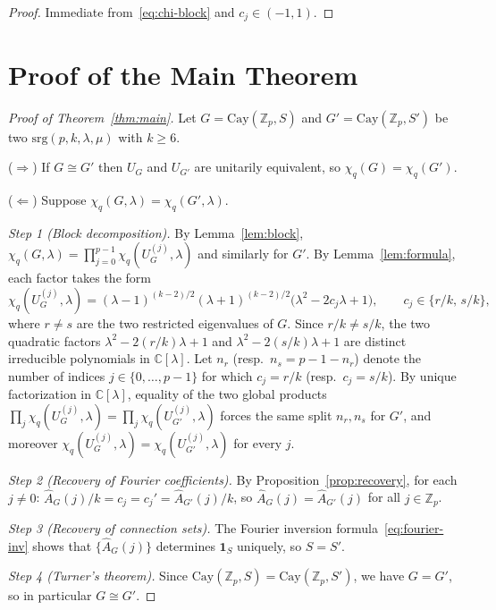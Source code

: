 \documentclass[12pt]{article}
\newcommand{\Z}{\mathbb{Z}}
\newcommand{\Cay}{\mathrm{Cay}}
\newcommand{\srg}{\mathrm{srg}}
\newcommand{\Uj}{U_G^{(j)}}
\begin{document}
\begin{proof}
  Immediate from~\eqref{eq:chi-block} and $c_j\in(-1,1)$.
\end{proof}

\section{Proof of the Main Theorem}
\label{sec:proof}

\begin{proof}[Proof of Theorem~\ref{thm:main}]
  Let $G = \Cay(\Z_p, S)$ and $G' = \Cay(\Z_p, S')$ be two
  $\srg(p,k,\lambda,\mu)$ with $k \geq 6$.

  \medskip
  \noindent($\Rightarrow$) If $G \cong G'$ then $U_G$ and $U_{G'}$ are
  unitarily equivalent, so $\chi_q(G)=\chi_q(G')$.

  \medskip
  \noindent($\Leftarrow$) Suppose $\chi_q(G,\lambda)=\chi_q(G',\lambda)$.

  \medskip
 \noindent\textit{Step 1 (Block decomposition).}
  By Lemma~\ref{lem:block},
  $\chi_q(G,\lambda) = \prod_{j=0}^{p-1}\chi_q(\Uj,\lambda)$
  and similarly for $G'$.  By Lemma~\ref{lem:formula}, each factor takes the form
  \[
    \chi_q(\Uj,\lambda)
    = (\lambda-1)^{(k-2)/2}(\lambda+1)^{(k-2)/2}
      \bigl(\lambda^2 - 2c_j\lambda + 1\bigr),
    \qquad c_j \in \{r/k,\, s/k\},
  \]
  where $r \neq s$ are the two restricted eigenvalues of $G$.
  Since $r/k \neq s/k$, the two quadratic factors
  $\lambda^2 - 2(r/k)\lambda+1$ and $\lambda^2 - 2(s/k)\lambda+1$
  are distinct irreducible polynomials in $\mathbb{C}[\lambda]$.
  Let $n_r$ (resp.\ $n_s = p-1-n_r$) denote the number of indices
  $j \in \{0,\ldots,p-1\}$ for which $c_j = r/k$ (resp.\ $c_j = s/k$).
  By unique factorization in $\mathbb{C}[\lambda]$, equality of the two
  global products $\prod_j \chi_q(\Uj,\lambda) = \prod_j \chi_q(U_{G'}^{(j)},\lambda)$
  forces the same split $n_r, n_s$ for $G'$, and moreover
  $\chi_q(\Uj,\lambda) = \chi_q(U_{G'}^{(j)},\lambda)$ for every $j$.

  \medskip
  \noindent\textit{Step 2 (Recovery of Fourier coefficients).}
  By Proposition~\ref{prop:recovery}, for each $j\neq 0$:
  $\widehat{A}_G(j)/k = c_j = c_j' = \widehat{A}_{G'}(j)/k$,
  so $\widehat{A}_G(j)=\widehat{A}_{G'}(j)$ for all $j\in\Z_p$.

  \medskip
  \noindent\textit{Step 3 (Recovery of connection sets).}
  The Fourier inversion formula~\eqref{eq:fourier-inv} shows that
  $\{\widehat{A}_G(j)\}$ determines $\mathbf{1}_S$ uniquely, so $S=S'$.

  \medskip
  \noindent\textit{Step 4 (Turner's theorem).}
  Since $\Cay(\Z_p,S)=\Cay(\Z_p,S')$, we have $G=G'$, so in particular
  $G\cong G'$.
\end{proof}
\end{document}
